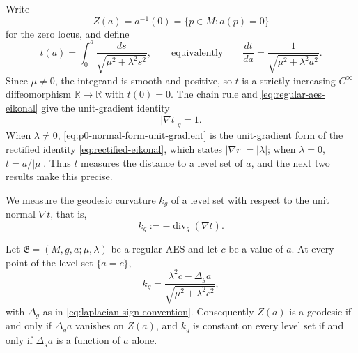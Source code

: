 Write
\begin{equation}\label{eq:p0-normal-form-zero-locus}
 Z(a)=a^{-1}(0)=\{p\in M:a(p)=0\}
\end{equation}
for the zero locus, and define
\begin{equation}\label{eq:p0-normal-form-t}
 t(a)=\int_0^a\frac{ds}{\sqrt{\mu^2+\lambda^2s^2}},
 \qquad\text{equivalently}\qquad
 \frac{dt}{da}=\frac1{\sqrt{\mu^2+\lambda^2a^2}} .
\end{equation}
Since $\mu\ne0$, the integrand is smooth and positive, so $t$ is a strictly
increasing $C^\infty$ diffeomorphism $\mathbb R\to\mathbb R$ with $t(0)=0$.  The
chain rule and \eqref{eq:regular-aes-eikonal} give the unit-gradient identity
\begin{equation}\label{eq:p0-normal-form-unit-gradient}
 |\nabla t|_g=1 .
\end{equation}
When $\lambda\ne0$, \eqref{eq:p0-normal-form-unit-gradient} is the unit-gradient
form of the rectified identity \eqref{eq:rectified-eikonal}, which states
$|\nabla r|=|\lambda|$; when $\lambda=0$, $t=a/|\mu|$.  Thus $t$ measures the
distance to a level set of $a$, and the next two results make this precise.

We measure the geodesic curvature $k_g$ of a level set with respect to the unit
normal $\nabla t$, that is,
\begin{equation}\label{eq:p0-normal-form-curvature-definition}
 k_g:=-\operatorname{div}_g(\nabla t).
\end{equation}

\begin{proposition}
\label{prop:p0-leaf-curvature}
Let $\mathfrak E=(M,g,a;\mu,\lambda)$ be a regular AES and let $c$ be a value of
$a$.  At every point of the level set $\{a=c\}$,
\begin{equation}\label{eq:p0-leaf-curvature}
 k_g=\frac{\lambda^2c-\Delta_ga}{\sqrt{\mu^2+\lambda^2c^2}},
\end{equation}
with $\Delta_g$ as in \eqref{eq:laplacian-sign-convention}.  Consequently
$Z(a)$ is a geodesic if and only if $\Delta_ga$ vanishes on $Z(a)$, and $k_g$ is
constant on every level set if and only if $\Delta_ga$ is a function of $a$
alone.
\end{proposition}

